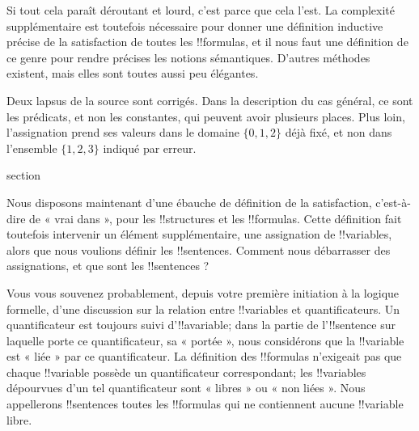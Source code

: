 \documentclass[11pt,a4paper,openany]{memoir}
\begin{document}
Si tout cela paraît déroutant et lourd, c'est parce que cela l'est. La
complexité supplémentaire est toutefois nécessaire pour donner une
définition inductive précise de la satisfaction de toutes les
!!{formula}s, et il nous faut une définition de ce genre pour rendre
précises les notions sémantiques. D'autres méthodes existent, mais elles
sont toutes aussi peu élégantes.

\begin{editorial}
Deux lapsus de la source sont corrigés. Dans la description du cas
général, ce sont les prédicats, et non les constantes, qui peuvent
avoir plusieurs places. Plus loin, l'assignation prend ses valeurs dans
le domaine $\{0,1,2\}$ déjà fixé, et non dans l'ensemble
$\{1,2,3\}$ indiqué par erreur.
\end{editorial}


\endgroup



\begingroup
\expandafter\def\csname ol@sectioncs\endcsname{section}
\def\olfilename{sentences}




Nous disposons maintenant d'une ébauche de définition de la
satisfaction, c'est-à-dire de « vrai dans », pour les !!{structure}s et
les !!{formula}s. Cette définition fait toutefois intervenir un
élément supplémentaire, une assignation de !!{variable}s, alors que
nous voulions définir les !!{sentence}s. Comment nous débarrasser des
assignations, et que sont les !!{sentence}s ?

Vous vous souvenez probablement, depuis votre première initiation à la
logique formelle, d'une discussion sur la relation entre
!!{variable}s et quantificateurs. Un quantificateur est toujours suivi
d'!!a{variable}; dans la partie de l'!!{sentence} sur laquelle porte ce
quantificateur, sa « portée », nous considérons que la !!{variable} est
« liée » par ce quantificateur. La définition des !!{formula}s
n'exigeait pas que chaque !!{variable} possède un quantificateur
correspondant; les !!{variable}s dépourvues d'un tel quantificateur
sont « libres » ou « non liées ». Nous appellerons !!{sentence}s toutes
les !!{formula}s qui ne contiennent aucune !!{variable} libre.
\end{document}
